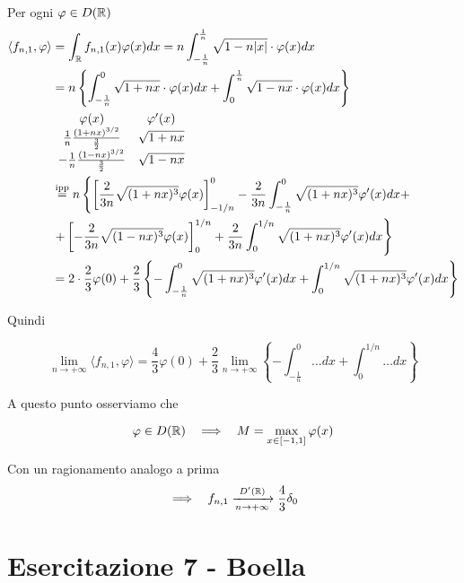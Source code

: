 \begin{enumerate}
Per ogni $\varphi \in D(\mathbb{R})$
\begin{align*}
\langle f_{n,1} ,\varphi \rangle  & = \int _{\mathbb{R} } f_{n,1}(x) \varphi (x) dx = n\int ^{\frac{1}{n}}_{ - \frac{1}{n}}\sqrt{1 - n| x| } \cdot \varphi (x) dx\\
 & = n\left\{\int ^{0}_{ - \frac{1}{n}}\sqrt{1 + nx} \cdot \varphi (x) dx + \int ^{\frac{1}{n}}_{0}\sqrt{1 - nx} \cdot \varphi (x) dx\right\}\\
 & 
 \begin{array}{ c c }
\varphi (x) & \varphi '(x)\\
\frac{1}{n}\frac{(1 + nx)^{3/2}}{\frac{3}{2}} & \sqrt{1 + nx}\\
- \frac{1}{n}\frac{(1 - nx)^{3/2}}{\frac{3}{2}} & \sqrt{1 - nx}
\end{array}\\
 & \overset{\text{ipp}}{ = } n\left\{\left[\frac{2}{3n}\sqrt{(1 + nx)^{3}} \varphi (x)\right]^{0}_{ - 1/n} - \frac{2}{3n}\int ^{0}_{ - \frac{1}{n}}\sqrt{(1 + nx)^{3}} \varphi '(x)dx + \right. \\
 & \left. + \left[ - \frac{2}{3n}\sqrt{(1 - nx)^{3}} \varphi (x)\right]^{1/n}_{0} + \frac{2}{3n}\int ^{1/n}_{0}\sqrt{(1 + nx)^{3}} \varphi '(x)dx\right\}\\
 & = 2\cdot \frac{2}{3} \varphi (0) + \frac{2}{3}\left\{ - \int ^{0}_{ - \frac{1}{n}}\sqrt{(1 + nx)^{3}} \varphi '(x)dx + \int ^{1/n}_{0}\sqrt{(1 + nx)^{3}} \varphi '(x)dx\right\}
\end{align*}

Quindi

\begin{equation*}
\lim\limits _{n\rightarrow + \infty } \langle f_{n,1} ,\varphi \rangle = \frac{4}{3} \varphi (0) + \frac{2}{3}\lim\limits _{n\rightarrow + \infty }\left\{ - \int ^{0}_{ - \frac{1}{n}} \dotsc dx + \int ^{1/n}_{0} \dotsc dx\right\}
\end{equation*}

A questo punto osserviamo che

\begin{equation*}
\varphi \in D(\mathbb{R}) \ \ \implies \ \ M = \max_{x\in [ - 1,1]} \varphi (x)
\end{equation*}

Con un ragionamento analogo a prima
\begin{equation*}
\implies \ \ f_{n,1}\xrightarrow[n\rightarrow + \infty ]{D'(\mathbb{R})}\frac{4}{3} \delta _{0}
\end{equation*}
\end{enumerate}
\chapter{Esercitazione 7 - Boella}
\ParteEsercizi
\Esercizio{}

